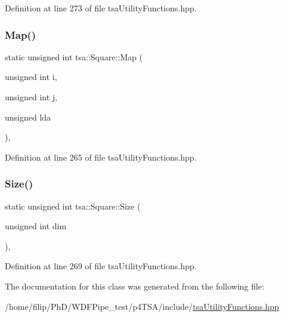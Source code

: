 Definition at line 273 of file tsa\+Utility\+Functions.\+hpp.

\mbox{\label{classtsa_1_1_square_adde315df70bffcc16a4293676d4e8efc}} 
\subsubsection{\texorpdfstring{Map()}{Map()}}
{\footnotesize\ttfamily static unsigned int tsa\+::\+Square\+::\+Map (\begin{DoxyParamCaption}\item[{unsigned int}]{i,  }\item[{unsigned int}]{j,  }\item[{unsigned}]{lda }\end{DoxyParamCaption})\hspace{0.3cm}{\ttfamily [inline]}, {\ttfamily [static]}}



Definition at line 265 of file tsa\+Utility\+Functions.\+hpp.

\mbox{\label{classtsa_1_1_square_a6ed8a7a76c2b315cdc7dee7ccf8d5395}} 
\subsubsection{\texorpdfstring{Size()}{Size()}}
{\footnotesize\ttfamily static unsigned int tsa\+::\+Square\+::\+Size (\begin{DoxyParamCaption}\item[{unsigned int}]{dim }\end{DoxyParamCaption})\hspace{0.3cm}{\ttfamily [inline]}, {\ttfamily [static]}}



Definition at line 269 of file tsa\+Utility\+Functions.\+hpp.



The documentation for this class was generated from the following file\+:\begin{DoxyCompactItemize}
\item 
/home/filip/\+Ph\+D/\+W\+D\+F\+Pipe\+\_\+test/p4\+T\+S\+A/include/\hyperlink{tsa_utility_functions_8hpp}{tsa\+Utility\+Functions.\+hpp}\end{DoxyCompactItemize}
